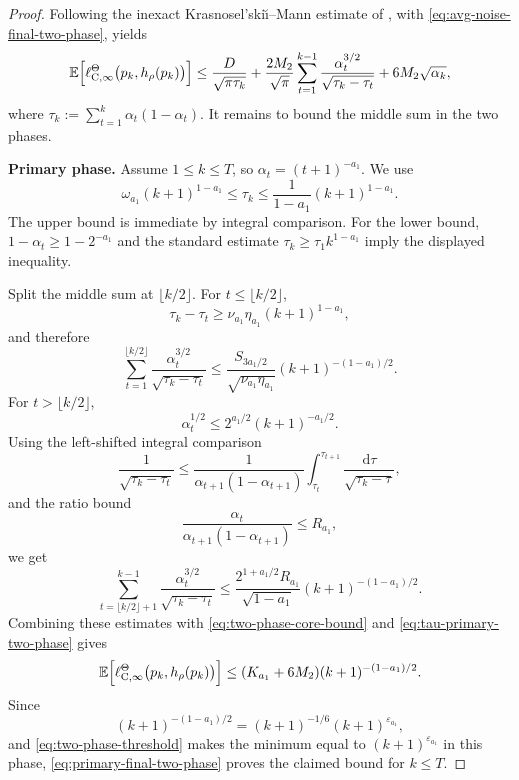 \documentclass{article}
\newcommand{\E}{\mathbb{E}}
\begin{document}
\begin{proof}
Following the inexact Krasnosel'ski\u{\i}--Mann estimate of \citet[Theorem~2.10]{bravo2024stochastic}, with \eqref{eq:avg-noise-final-two-phase}, yields
\begin{equation}\label{eq:two-phase-core-bound}
\E\Bigl[\ell^\Theta_{\mathrm C,\infty}\bigl(p_k,h_\rho(p_k)\bigr)\Bigr]\le \frac{D}{\sqrt{\pi\tau_k}}+\frac{2M_2}{\sqrt{\pi}}\sum_{t=1}^{k-1}\frac{\alpha_t^{3/2}}{\sqrt{\tau_k-\tau_t}}+6M_2\sqrt{\alpha_k},
\end{equation}
where $\tau_k:=\sum_{t=1}^k\alpha_t(1-\alpha_t)$. It remains to bound the middle sum in the two phases.

\textbf{Primary phase.}
Assume $1\le k\le T$, so $\alpha_t=(t+1)^{-a_1}$. We use
\begin{equation}\label{eq:tau-primary-two-phase}
\omega_{a_1}(k+1)^{1-a_1}\le \tau_k\le \frac{1}{1-a_1}(k+1)^{1-a_1}.
\end{equation}
The upper bound is immediate by integral comparison. For the lower bound, $1-\alpha_t\ge1-2^{-a_1}$ and the standard estimate $\tau_k\ge \tau_1 k^{1-a_1}$ imply the displayed inequality.

Split the middle sum at $\lfloor k/2\rfloor$. For $t\le\lfloor k/2\rfloor$,
\begin{equation}
\tau_k-\tau_t\ge \nu_{a_1}\eta_{a_1}(k+1)^{1-a_1},
\end{equation}
and therefore
\begin{equation}
\sum_{t=1}^{\lfloor k/2\rfloor}\frac{\alpha_t^{3/2}}{\sqrt{\tau_k-\tau_t}} \le \frac{S_{3a_1/2}}{\sqrt{\nu_{a_1}\eta_{a_1}}}(k+1)^{-(1-a_1)/2}.
\end{equation}
For $t>\lfloor k/2\rfloor$,
\begin{equation}
\alpha_t^{1/2}\le 2^{a_1/2}(k+1)^{-a_1/2}.
\end{equation}
Using the left-shifted integral comparison
\begin{equation}
\frac{1}{\sqrt{\tau_k-\tau_t}}\le \frac{1}{\alpha_{t+1}(1-\alpha_{t+1})}\int_{\tau_t}^{\tau_{t+1}}\frac{\mathrm d\tau}{\sqrt{\tau_k-\tau}},
\end{equation}
and the ratio bound
\begin{equation}
\frac{\alpha_t}{\alpha_{t+1}(1-\alpha_{t+1})}\le R_{a_1},
\end{equation}
we get
\begin{equation}
\sum_{t=\lfloor k/2\rfloor+1}^{k-1}\frac{\alpha_t^{3/2}}{\sqrt{\tau_k-\tau_t}} \le \frac{2^{1+a_1/2}R_{a_1}}{\sqrt{1-a_1}}(k+1)^{-(1-a_1)/2}.
\end{equation}
Combining these estimates with \eqref{eq:two-phase-core-bound} and \eqref{eq:tau-primary-two-phase} gives
\begin{equation}\label{eq:primary-final-two-phase}
\E\Bigl[\ell^\Theta_{\mathrm C,\infty}\bigl(p_k,h_\rho(p_k)\bigr)\Bigr]\le (K_{a_1}+6M_2)(k+1)^{-(1-a_1)/2}.
\end{equation}
Since
\begin{equation}
(k+1)^{-(1-a_1)/2}=(k+1)^{-1/6}(k+1)^{\varepsilon_{a_1}},
\end{equation}
and \eqref{eq:two-phase-threshold} makes the minimum equal to $(k+1)^{\varepsilon_{a_1}}$ in this phase, \eqref{eq:primary-final-two-phase} proves the claimed bound for $k\le T$.


\end{proof}
\end{document}
